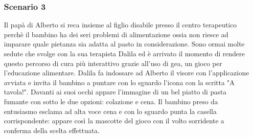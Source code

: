 \subsubsection{Scenario 3}
Il papà di Alberto si reca insieme al figlio disabile presso il centro terapeutico perchè il bambino ha dei seri problemi di alimentazione ossia non riesce ad imparare quale pietanza sia adatta al pasto in considerazione. Sono ormai molte sedute che svolge con la sua terapista Dalila ed è arrivato il momento di rendere questo percorso di cura più interattivo grazie all'uso di \acs{gea}, un gioco per l'educazione alimentare. Dalila fa indossare ad Alberto il visore con l'applicazione avviata e invita il bambino a puntare con lo sguardo l'icona con la scritta "A tavola!". Davanti ai suoi occhi appare l'immagine di un bel piatto di pasta fumante con sotto le due opzioni: colazione e cena. Il bambino preso da entusiasmo esclama ad alta voce cena e con lo sguardo punta la casella corrispondente: appare così la mascotte del gioco con il volto sorridente a conferma della scelta effettuata.